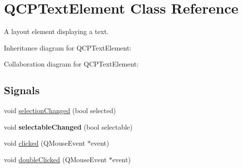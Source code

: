 \hypertarget{classQCPTextElement}{}\section{Q\+C\+P\+Text\+Element Class Reference}
\label{classQCPTextElement}


A layout element displaying a text.  




Inheritance diagram for Q\+C\+P\+Text\+Element\+:


Collaboration diagram for Q\+C\+P\+Text\+Element\+:
\subsection*{Signals}
\begin{DoxyCompactItemize}
\item 
void \hyperlink{classQCPTextElement_a49f45b87ee9c1fe866c2cdd12af17a9a}{selection\+Changed} (bool selected)
\item 
\mbox{\label{classQCPTextElement_ac4567260b52d02bfbad63357d13986c5}} 
void {\bfseries selectable\+Changed} (bool selectable)
\item 
void \hyperlink{classQCPTextElement_ad2246a0e701c0655623f048737298334}{clicked} (Q\+Mouse\+Event $\ast$event)
\item 
void \hyperlink{classQCPTextElement_a9c6fd27ae8a7c3a02df7a6bbd3509e40}{double\+Clicked} (Q\+Mouse\+Event $\ast$event)
\end{DoxyCompactItemize}
